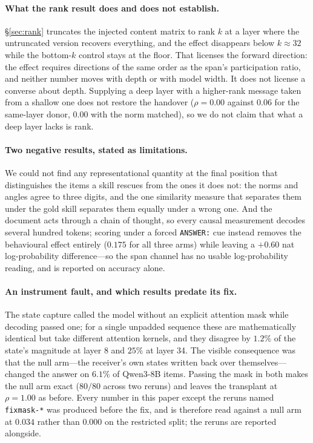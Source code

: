\documentclass{article}
\begin{document}
\paragraph{What the rank result does and does not establish.}
\S\ref{sec:rank} truncates the injected content matrix to rank $k$ at a layer
where the untruncated version recovers everything, and the effect disappears
below $k\approx32$ while the bottom-$k$ control stays at the floor. That
licenses the forward direction: the effect requires directions of the same order
as the span's participation ratio, and neither number moves with depth or with
model width. It does not license a converse about depth. Supplying a deep layer
with a higher-rank message taken from a shallow one does not restore the
handover ($\rho=0.00$ against $0.06$ for the same-layer donor, $0.00$ with the
norm matched), so we do not claim that what a deep layer lacks is rank.

\paragraph{Two negative results, stated as limitations.} We could not find any
representational quantity at the final position that distinguishes the items a
skill rescues from the ones it does not: the norms and angles agree to three
digits, and the one similarity measure that separates them under the gold skill
separates them equally under a wrong one. And the document acts through a chain
of thought, so every causal measurement decodes several hundred tokens; scoring
under a forced \texttt{ANSWER:} cue instead removes the behavioural effect
entirely ($0.175$ for all three arms) while leaving a $+0.60$ nat
log-probability difference---so the span channel has no usable log-probability
reading, and is reported on accuracy alone.

\paragraph{An instrument fault, and which results predate its fix.} The state
capture called the model without an explicit attention mask while decoding
passed one; for a single unpadded sequence these are mathematically identical
but take different attention kernels, and they disagree by $1.2\%$ of the
state's magnitude at layer 8 and $25\%$ at layer 34. The visible consequence was
that the null arm---the receiver's own states written back over
themselves---changed the answer on $6.1\%$ of Qwen3-8B items. Passing the mask in
both makes the null arm exact ($80/80$ across two reruns) and leaves the transplant at
$\rho = 1.00$ as before. Every number in this paper except the reruns named
\texttt{fixmask-*} was produced before the fix, and is therefore read against a
null arm at $0.034$ rather than $0.000$ on the restricted split; the reruns are
reported alongside.
\end{document}
